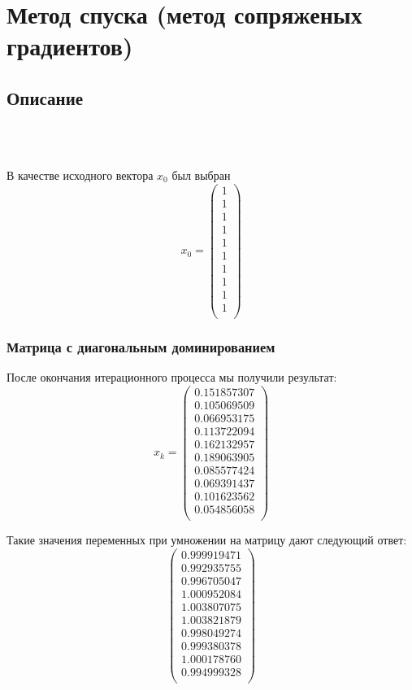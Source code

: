 \documentclass[../../report.tex]{subfiles}
\begin{document}
\chapter{Метод спуска (метод сопряженых градиентов)}

\section{Описание}
\\
\\

В качестве исходного вектора $x_0$ был выбран
\[
x_0 =
\begin{pmatrix}
  1 \\
  1 \\
  1 \\
  1 \\
  1 \\
  1 \\
  1 \\
  1 \\
  1 \\
  1 \\
\end{pmatrix}
\]

\subsection{Матрица с диагональным доминированием}
После окончания итерационного процесса мы получили результат:
\[
x_{k} = 
\begin{pmatrix}
    0.151857307 \\
    0.105069509 \\
    0.066953175 \\
    0.113722094 \\
    0.162132957 \\
    0.189063905 \\
    0.085577424 \\
    0.069391437 \\
    0.101623562 \\
    0.054856058 \\
\end{pmatrix}
\]

Такие значения переменных при умножении на матрицу дают следующий ответ:
\[
\begin{pmatrix}
    0.999919471 \\
    0.992935755 \\
    0.996705047 \\
    1.000952084 \\
    1.003807075 \\
    1.003821879 \\
    0.998049274 \\
    0.999380378 \\
    1.000178760 \\
    0.994999328 \\
\end{pmatrix}
\]
\end{document}
